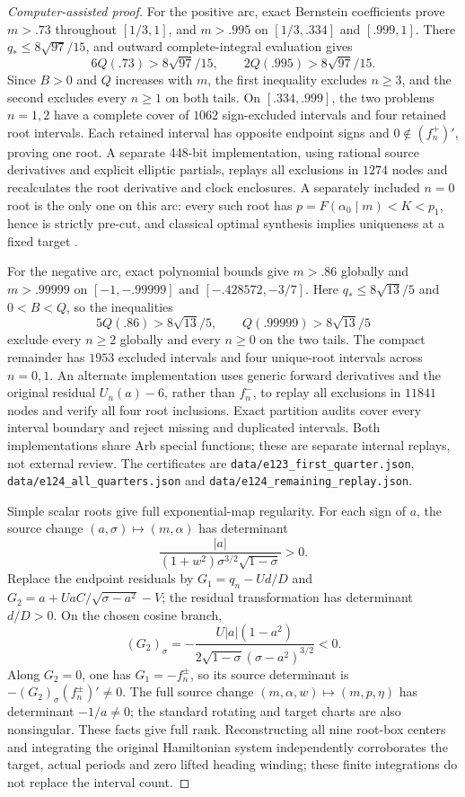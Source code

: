 \documentclass[11pt,a4paper]{article}
\theoremstyle{remark}\newtheorem{remark}[theorem]{Remark}
\begin{document}
\begin{proof}[Computer-assisted proof]
For the positive arc, exact Bernstein coefficients prove $m>.73$
throughout $[1/3,1]$, and $m>.995$ on $[1/3,.334]$ and $[.999,1]$.
There $q_*\le8\sqrt{97}/15$, and outward complete-integral evaluation gives
\[
 6Q(.73)>8\sqrt{97}/15,\qquad 2Q(.995)>8\sqrt{97}/15.
\]
Since $B>0$ and $Q$ increases with $m$, the first inequality excludes
$n\ge3$, and the second excludes every $n\ge1$ on both tails.
On $[.334,.999]$, the two problems $n=1,2$ have a complete cover of
$1062$ sign-excluded intervals and four retained root intervals.
Each retained interval has opposite endpoint signs and $0\notin(f_n^+)'$,
proving one root. A separate 448-bit implementation, using rational source
derivatives and explicit elliptic partials, replays all exclusions in
$1274$ nodes and recalculates the root derivative and clock enclosures.
A separately included $n=0$ root is the only one on this arc: every such
root has $p=F(\alpha_0\mid m)<K<p_1$, hence is strictly pre-cut, and
classical optimal synthesis implies uniqueness at a fixed target
\cite[Theorems 3.1--3.2]{SS}.

For the negative arc, exact polynomial bounds give $m>.86$ globally
and $m>.99999$ on $[-1,-.99999]$ and $[-.428572,-3/7]$.
Here $q_*\le8\sqrt{13}/5$ and $0<B<Q$, so the inequalities
\[
 5Q(.86)>8\sqrt{13}/5,\qquad Q(.99999)>8\sqrt{13}/5
\]
exclude every $n\ge2$ globally and every $n\ge0$ on the two tails.
The compact remainder has $1953$ excluded intervals and four unique-root
intervals across $n=0,1$. An alternate implementation uses generic
forward derivatives and the original residual $U_n(a)-6$, rather than
$f_n^-$, to replay all exclusions in $11841$ nodes and verify all four
root inclusions. Exact partition audits cover every interval boundary
and reject missing and duplicated intervals. Both implementations share
Arb special functions; these are separate internal replays, not external
review. The certificates are
\nolinkurl{data/e123_first_quarter.json},
\nolinkurl{data/e124_all_quarters.json} and
\nolinkurl{data/e124_remaining_replay.json}.

Simple scalar roots give full exponential-map regularity. For each sign
of $a$, the source change $(a,\sigma)\mapsto(m,\alpha)$ has determinant
\[
 \frac{|a|}{(1+w^2)\sigma^{3/2}\sqrt{1-\sigma}}>0.
\]
Replace the endpoint residuals by
$G_1=q_n-Ud/D$ and
$G_2=a+UaC/\sqrt{\sigma-a^2}-V$; the residual transformation has
determinant $d/D>0$. On the chosen cosine branch,
\[
 (G_2)_\sigma=-\frac{U|a|(1-a^2)}
 {2\sqrt{1-\sigma}(\sigma-a^2)^{3/2}}<0.
\]
Along $G_2=0$, one has $G_1=-f_n^\pm$, so its source determinant is
$-(G_2)_\sigma(f_n^\pm)'\ne0$. The full source change $(m,\alpha,w)\mapsto(m,p,\eta)$ has
determinant $-1/a\ne0$; the standard rotating and target charts are
also nonsingular. These facts give full rank. Reconstructing all nine root-box
centers and integrating the original Hamiltonian system independently
corroborates the target, actual periods and zero lifted heading winding;
these finite integrations do not replace the interval count.


\end{proof}
\end{document}
